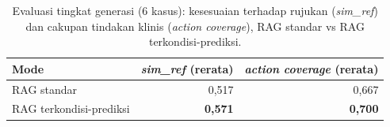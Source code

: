 \begin{table}[htbp]
\centering
\caption{Evaluasi tingkat generasi (6 kasus): kesesuaian terhadap rujukan (\emph{sim\_ref}) dan cakupan tindakan klinis (\emph{action coverage}), RAG standar vs RAG terkondisi-prediksi.}
\label{tab:evaluasi-generasi}
\small
\begin{tabular}{@{}lrr@{}}
\toprule
\textbf{Mode} & \textbf{\emph{sim\_ref} (rerata)} & \textbf{\emph{action coverage} (rerata)} \\
\midrule
RAG standar & 0,517 & 0,667 \\
RAG terkondisi-prediksi & \textbf{0,571} & \textbf{0,700} \\
\bottomrule
\end{tabular}
\end{table}
